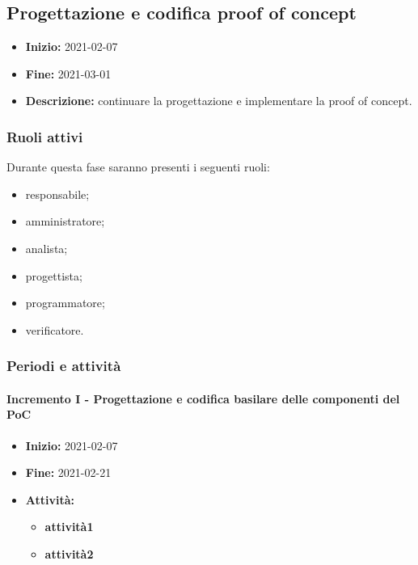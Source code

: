 
\subsection{Progettazione e codifica proof of concept} \label{_pianificazioneProgettazioneCodificaPoC}
\begin{itemize}
    \item []\textbf{Inizio:} 2021-02-07
    \item []\textbf{Fine:} 2021-03-01
    \item []\textbf{Descrizione:} continuare la progettazione e implementare la proof of concept.
\end{itemize}

\subsubsection{Ruoli attivi}
Durante questa fase saranno presenti i seguenti ruoli:
\begin{itemize}
    \item responsabile;
    \item amministratore;
    \item analista;
    \item progettista;
    \item programmatore;
    \item verificatore.
\end{itemize}

\subsubsection{Periodi e attività}

\paragraph[Incremento I]{Incremento I - \textnormal{Progettazione e codifica basilare delle componenti del PoC}}
\begin{itemize}
    \item [] \textbf{Inizio:} 2021-02-07
    \item [] \textbf{Fine:} 2021-02-21
    \item [] \textbf{Attività:}
          \begin{itemize}
              \item \textbf{attività1}
              \item \textbf{attività2}
          \end{itemize}
\end{itemize}

